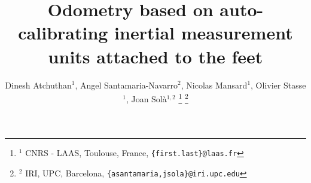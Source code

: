 \documentclass[letterpaper, 10 pt, conference]{ieeeconf}  %
\title{\LARGE \bf
Odometry based on auto-calibrating inertial measurement units attached to the feet
}
\author{Dinesh Atchuthan$^{1}$, Angel Santamaria-Navarro$^{2}$, Nicolas Mansard$^1$, Olivier Stasse$^1$, Joan Sol\`a$^{1,2}$%
\thanks{$^{1}$ CNRS - LAAS, Toulouse, France, \tt {\footnotesize \{first.last\}@laas.fr}}%
\thanks{$^{2}$ IRI, UPC, Barcelona, \tt{\footnotesize \{asantamaria,jsola\}@iri.upc.edu}}
}
\begin{document}
\maketitle
\thispagestyle{empty}
\pagestyle{empty}

\begin{abstract}

\end{abstract}












\end{document}
